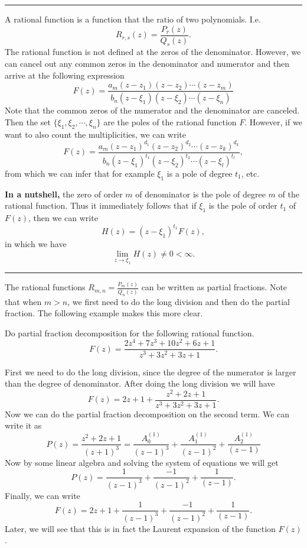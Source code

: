 \hrule

\begin{fact}
	A rational function is a function that the ratio of two polynomials. I.e.
	\[ R_{r,s}(z) = \frac{P_r(z)}{Q_s(z)}. \]
	The rational function is not defined at the zeros of the denominator. However, we can cancel out any common zeros in the denominator and numerator and then arrive at the following expression
	\[ F(z) = \frac{a_m(z-z_1)(z-z_2)\cdots(z-z_m)}{b_n(z-\xi_1)(z-\xi_2)\cdots(z-\xi_n)} \]
	Note that the common zeros of the numerator and the denominator are canceled. Then the set $\{ \xi_1, \xi_2, \cdots, \xi_n \}$ are the poles of the rational function $F$. However, if we want to also count the multiplicities, we can write
	\[ F(z) = \frac{a_m(z-z_1)^{d_1}(z-z_2)^{d_2}\cdots(z-z_k)^{d_k}}{b_n(z-\xi_1)^{t_1}(z-\xi_2)^{t_2}\cdots(z-\xi_l)^{t_l}}, \]
	from which we can infer that for example $\xi_1$ is a pole of degree $t_1$, etc.
	
	\textbf{In a nutshell,} the zero of order $m$ of denominator is the pole of degree $m$ of the rational function. Thus it immediately follows that if $\xi_1$ is the pole of order $t_1$ of  $F(z)$, then we can write
	\[ H(z) = (z-\xi_1)^{t_1} F(z), \] 
	in which we have
	\[ \lim_{z\to \xi_1} H(z) \neq 0 < \infty. \]
	
\end{fact}


\hrule


\begin{fact}
	The rational functions $R_{m,n} = \frac{P_m(z)}{Q_n(z)}$ can be written as partial fractions. Note that when $m>n$, we first need to do the long division and then do the partial fraction. The following example makes this more clear.
\end{fact}

\begin{exm}
	Do partial fraction decomposition for the following rational function.
	\[ F(z) = \frac{2z^4+7z^3+10z^2+6z+1}{z^3+3z^2+3z+1}. \]
\end{exm}

\begin{answer}
	First we need to do the long division, since the degree of the numerator is larger than the degree of denominator. After doing the long division we will have
	\[ F(z) = 2z + 1 + \frac{z^2 + 2z + 1}{z^3+3z^2+3z+1}. \]
	Now we can do the partial fraction decomposition on the second term. We can write it as
	\[ P(z) = \frac{z^2 + 2z + 1}{(z+1)^3} = \frac{A_0^{(1)}}{(z-1)^3} + 
	\frac{A_1^{(1)}}{(z-1)^2} + \frac{A_2^{(1)}}{(z-1)} \]
	Now by some linear algebra and solving the system of equations we will get
	\[ P(z) = \frac{1}{(z-1)^3} + 
	\frac{-1}{(z-1)^2} + \frac{1}{(z-1)}. \]
	Finally, we can write
	\[ F(z) = 2z + 1 +  \frac{1}{(z-1)^3} + 
	\frac{-1}{(z-1)^2} + \frac{1}{(z-1)}. \]
	Later, we will see that this is in fact the Laurent expansion of the function $F(z)$. 
\end{answer}

